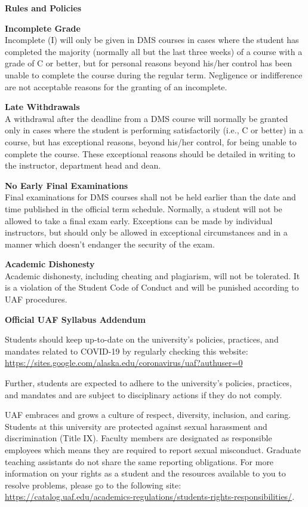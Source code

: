 \documentclass[12pt]{article}
\renewcommand{\emph}[1]{\textsf{\textbf{#1}}}
\newcommand{\localhead}[1]{\par\smallskip\textbf{#1} \smallskip\nobreak\\}%
\def\heading#1{\localhead{\large\emph{#1}}}
\def\subheading#1{\localhead{\emph{#1}}}
\begin{document}
\heading{Rules and Policies}
\vskip -20pt

\subheading{Incomplete Grade} 
Incomplete (I) will only be given in
  DMS courses in cases where
  the student has completed the majority (normally all but the last
  three weeks) of a course with a grade of C or better, but for
  personal reasons beyond his/her control has been unable to complete
  the course during the regular term. Negligence or indifference are
  not acceptable reasons for the granting of an incomplete. 

\subheading{Late Withdrawals} 
A withdrawal after the deadline from a DMS course will
  normally be granted only in cases where the student is performing
  satisfactorily (i.e., C or better) in a course, but has exceptional
  reasons, beyond his/her control, for being unable to complete the
  course. These exceptional reasons should be detailed in writing to
  the instructor, department head and dean.

\subheading{No Early Final Examinations}
Final examinations for DMS
  courses shall not be held earlier than the date and time published
  in the official term schedule. Normally, a student will not be
  allowed to take a final exam early. Exceptions can be made by
  individual instructors, but should only be allowed in exceptional
  circumstances and in a manner which doesn't endanger the security of
  the exam.

\subheading{Academic Dishonesty}
Academic dishonesty, including cheating and plagiarism, will not
be tolerated.  It is a violation of the Student Code of Conduct
and will be punished according to UAF procedures.


\textbf{\large{Official UAF Syllabus Addendum}}
 
\hfill

 Students should keep up-to-date on the university's policies, practices, and mandates related to COVID-19 by regularly checking this website: \url{https://sites.google.com/alaska.edu/coronavirus/uaf?authuser=0}

Further, students are expected to adhere to the university's policies, practices, and mandates and are subject to disciplinary actions if they do not comply.

 UAF embraces and grows a culture of respect, diversity, inclusion, and caring. Students at this university are protected against sexual harassment and discrimination (Title IX). Faculty members are designated as responsible employees which means they are required to report sexual misconduct. Graduate teaching assistants do not share the same reporting obligations. For more information on your rights as a student and the resources available to you to resolve problems, please go to the following site: \url{https://catalog.uaf.edu/academics-regulations/students-rights-responsibilities/}.
\end{document}
